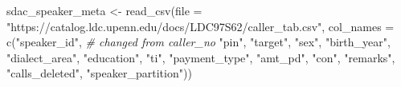 \documentclass[
]{article}
\newenvironment{Shaded}{\begin{snugshade}}{\end{snugshade}}
\newcommand{\AttributeTok}[1]{\textcolor[rgb]{0.77,0.63,0.00}{#1}}
\newcommand{\CommentTok}[1]{\textcolor[rgb]{0.56,0.35,0.01}{\textit{#1}}}
\newcommand{\FunctionTok}[1]{\textcolor[rgb]{0.00,0.00,0.00}{#1}}
\newcommand{\NormalTok}[1]{#1}
\newcommand{\OtherTok}[1]{\textcolor[rgb]{0.56,0.35,0.01}{#1}}
\newcommand{\StringTok}[1]{\textcolor[rgb]{0.31,0.60,0.02}{#1}}
\begin{document}
\begin{Shaded}
\begin{Highlighting}[]
\NormalTok{sdac\_speaker\_meta }\OtherTok{\textless{}{-}} 
  \FunctionTok{read\_csv}\NormalTok{(}\AttributeTok{file =} \StringTok{"https://catalog.ldc.upenn.edu/docs/LDC97S62/caller\_tab.csv"}\NormalTok{, }
           \AttributeTok{col\_names =} \FunctionTok{c}\NormalTok{(}\StringTok{"speaker\_id"}\NormalTok{, }\CommentTok{\# changed from \textasciigrave{}caller\_no\textasciigrave{}}
                         \StringTok{"pin"}\NormalTok{,}
                         \StringTok{"target"}\NormalTok{,}
                         \StringTok{"sex"}\NormalTok{,}
                         \StringTok{"birth\_year"}\NormalTok{,}
                         \StringTok{"dialect\_area"}\NormalTok{,}
                         \StringTok{"education"}\NormalTok{,}
                         \StringTok{"ti"}\NormalTok{,}
                         \StringTok{"payment\_type"}\NormalTok{,}
                         \StringTok{"amt\_pd"}\NormalTok{,}
                         \StringTok{"con"}\NormalTok{,}
                         \StringTok{"remarks"}\NormalTok{,}
                         \StringTok{"calls\_deleted"}\NormalTok{,}
                         \StringTok{"speaker\_partition"}\NormalTok{))}


\end{Highlighting}
\end{Shaded}
\end{document}
